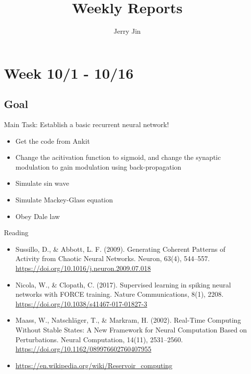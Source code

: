 \documentclass[12pt, a4paper]{article}
\title{Weekly Reports}
\author{Jerry Jin}
\begin{document}
\maketitle

\section*{Week 10/1 - 10/16}

\subsection*{Goal}

\noindent
Main Task: Establish a basic recurrent neural network!

\begin{itemize}
    \item Get the code from Ankit
    \item Change the acitivation function to sigmoid, and change the synaptic modulation to gain modulation using back-propagation
    \item Simulate sin wave
    \item Simulate Mackey-Glass equation
    \item Obey Dale law
\end{itemize}

\noindent
Reading

\begin{itemize}
    \item Sussillo, D., \& Abbott, L. F. (2009). Generating Coherent Patterns of Activity from Chaotic Neural Networks. Neuron, 63(4), 544–557. \url{https://doi.org/10.1016/j.neuron.2009.07.018}
    \item Nicola, W., \& Clopath, C. (2017). Supervised learning in spiking neural networks with FORCE training. Nature Communications, 8(1), 2208. \url{https://doi.org/10.1038/s41467-017-01827-3}
    \item Maass, W., Natschläger, T., \& Markram, H. (2002). Real-Time Computing Without Stable States: A New Framework for Neural Computation Based on Perturbations. Neural Computation, 14(11), 2531–2560. \url{https://doi.org/10.1162/089976602760407955}
    \item \url{https://en.wikipedia.org/wiki/Reservoir_computing}
\end{itemize}

\newpage
\end{document}
